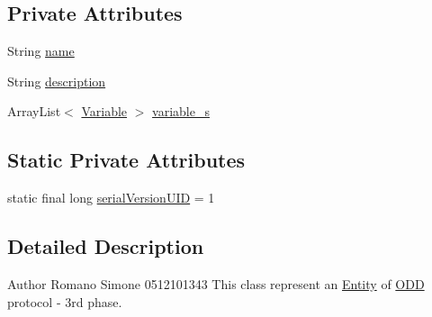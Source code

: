 \subsection*{Private Attributes}
\begin{DoxyCompactItemize}
\item 
String \hyperlink{classit_1_1isislab_1_1masonassisteddocumentation_1_1_o_d_d_1_1_entity_afa67ee9979036d7812d4bc6ac2936865}{name}
\item 
String \hyperlink{classit_1_1isislab_1_1masonassisteddocumentation_1_1_o_d_d_1_1_entity_aa4f4f6cb7b0e3aeee10e148094953511}{description}
\item 
Array\-List$<$ \hyperlink{classit_1_1isislab_1_1masonassisteddocumentation_1_1_o_d_d_1_1_variable}{Variable} $>$ \hyperlink{classit_1_1isislab_1_1masonassisteddocumentation_1_1_o_d_d_1_1_entity_a238b1599f0dde81c9e906abf57c120e6}{variable\-\_\-s}
\end{DoxyCompactItemize}
\subsection*{Static Private Attributes}
\begin{DoxyCompactItemize}
\item 
static final long \hyperlink{classit_1_1isislab_1_1masonassisteddocumentation_1_1_o_d_d_1_1_entity_a539ed234172438f219b48255f239854a}{serial\-Version\-U\-I\-D} = 1
\end{DoxyCompactItemize}


\subsection{Detailed Description}
\begin{DoxyAuthor}{Author}
Romano Simone 0512101343 This class represent an \hyperlink{classit_1_1isislab_1_1masonassisteddocumentation_1_1_o_d_d_1_1_entity}{Entity} of \hyperlink{classit_1_1isislab_1_1masonassisteddocumentation_1_1_o_d_d_1_1_o_d_d}{O\-D\-D} protocol -\/ 3rd phase. 
\end{DoxyAuthor}


